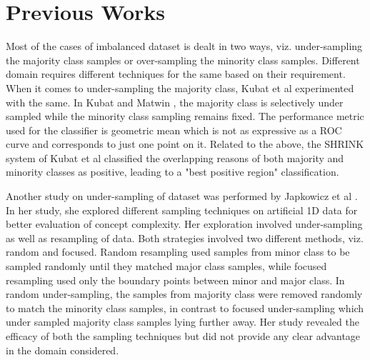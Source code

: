 \documentclass[10pt,journal,compsoc]{IEEEtran}
\begin{document}

\section{Previous Works}
\label{sec:works}
Most of the cases of imbalanced dataset is dealt in two ways, viz. under-sampling the majority class samples or over-sampling the minority class samples.
Different domain requires different techniques for the same based on their requirement. 
When it comes to under-sampling the majority class, Kubat et al \cite{kubat97}\cite{kubat98} experimented with the same.
In Kubat and Matwin \cite{kubat97}, the majority class is selectively under sampled while the minority class sampling remains fixed. 
The performance metric used for the classifier is geometric mean which is not as expressive as a ROC curve and corresponds to just one point on it.
Related to the above, the SHRINK system of Kubat et al \cite{kubat98} classified the overlapping reasons of both majority and minority classes as positive, leading to a "best positive region" classification.
 
Another study on under-sampling of dataset was performed by Japkowicz et al \cite{japkowicz00}. 
In her study, she explored different sampling techniques on artificial 1D data for better evaluation of concept complexity.
Her exploration involved under-sampling as well as resampling of data.
Both strategies involved two different methods, viz. random and focused. 
Random resampling used samples from minor class to be sampled randomly until they matched major class samples, while focused resampling used only the boundary points between minor and major class.
In random under-sampling, the samples from majority class were removed randomly to match the minority class samples, in contrast to focused under-sampling which under sampled majority class samples lying further away.
Her study revealed the efficacy of both the sampling techniques but did not provide any clear advantage in the domain considered.
\end{document}
